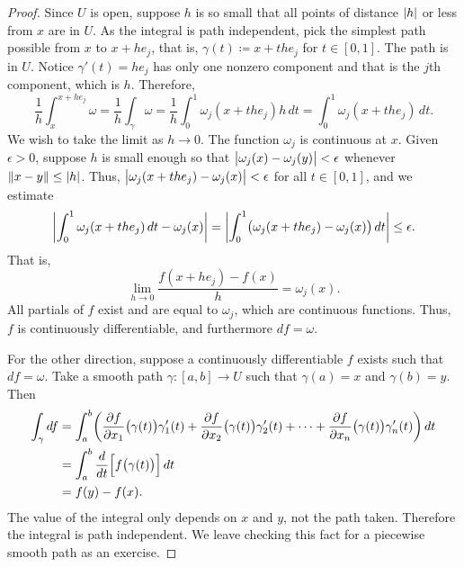 \begin{proof}
Since $U$ is open, suppose $h$ is so small that all points of distance
$\lvert {h} \rvert$ or
less from $x$ are in $U$.
As the integral is path independent,
pick the simplest path possible from $x$ to $x+he_j$, that is,
$\gamma(t) \coloneqq x+t he_j$ for $t \in [0,1]$.  The path is in $U$.
Notice $\gamma'(t) = h e_j$
has only one nonzero component and that is the $j$th component, which is
$h$.  Therefore,
\begin{equation*}
\frac{1}{h} \int_{x}^{x+he_j} \omega 
=
\frac{1}{h} \int_{\gamma} \omega 
=
\frac{1}{h} \int_0^1 \omega_j(x+the_j) h \, dt 
=
\int_0^1 \omega_j(x+the_j) \, dt  .
\end{equation*}
We wish to take the limit as $h \to 0$.  The function $\omega_j$ is
continuous at $x$.  Given $\epsilon > 0$, suppose $h$ is small enough so that
$\bigl\lvert {\omega_j(x)-\omega_j(y)} \bigr\rvert < \epsilon$ whenever $\lVert {x-y} \rVert \leq \lvert {h} \rvert$.
Thus,
$\bigl\lvert {\omega_j(x+the_j)-\omega_j(x)} \bigr\rvert < \epsilon$ for all $t \in [0,1]$,
and we estimate
\begin{equation*}
\left\lvert {\int_0^1 \omega_j(x+the_j) \, dt  - \omega_j(x)} \right\rvert
=
\left\lvert {\int_0^1 \bigl( \omega_j(x+the_j) - \omega_j(x) \bigr) \, dt} \right\rvert
\leq
\epsilon .
\end{equation*}
That is,
\begin{equation*}
\lim_{h\to 0}\frac{f(x+h e_j) - f(x)}{h} = \omega_j(x) .
\end{equation*}
All partials of $f$ exist and are equal to $\omega_j$, which are continuous
functions.  Thus, $f$ is continuously differentiable, and furthermore
$df = \omega$.

For the other direction,
suppose a continuously differentiable $f$ exists such that $df = \omega$.
Take a smooth
path
$\gamma \colon [a,b] \to U$ such that $\gamma(a) = x$ and
$\gamma(b) = y$.  Then
\begin{equation*}
\begin{split}
\int_\gamma df
& =
\int_a^b
\biggl(
\frac{\partial f}{\partial x_1}\bigl(\gamma(t)\bigr) \gamma_1'(t)+
\frac{\partial f}{\partial x_2}\bigl(\gamma(t)\bigr) \gamma_2'(t)+ \cdots +
\frac{\partial f}{\partial x_n}\bigl(\gamma(t)\bigr) \gamma_n'(t)
\biggr) \, dt
\\
& = 
\int_a^b
\frac{d}{dt} \Bigl[ f\bigl(\gamma(t)\bigr) \Bigr]\, dt
\\
& = f(y)-f(x) .
\end{split}
\end{equation*}
The value of the integral only depends on $x$ and $y$, not the
path taken.  Therefore the integral is path independent.
We leave checking this fact for a piecewise smooth path as an exercise.
\end{proof}

